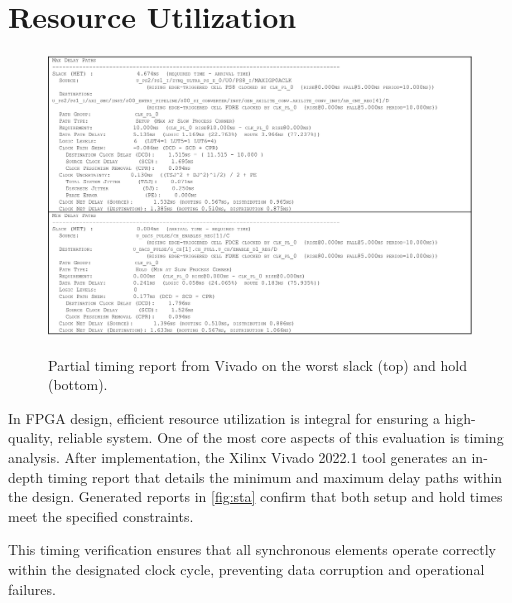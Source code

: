 \section{Resource Utilization}
\begin{figure}[ht]
    \centering
    \includegraphics[width=1\linewidth]{figures/timimg_report.png}
    \caption{Partial timing report from Vivado on the worst slack (top) and hold (bottom).}
    \setlength{\abovecaptionskip}{0pt}    %
    \setlength{\belowcaptionskip}{0pt}    %
    \label{fig:sta}
\end{figure}

In FPGA design, efficient resource utilization is integral for ensuring a high-quality, reliable system. One of the most core aspects of this evaluation is timing analysis. After implementation, the Xilinx Vivado 2022.1 tool generates an in-depth timing report that details the minimum and maximum delay paths within the design. Generated reports in \autoref{fig:sta} confirm that both setup and hold times meet the specified constraints.

This timing verification ensures that all synchronous elements operate correctly within the designated clock cycle, preventing data corruption and operational failures. 

